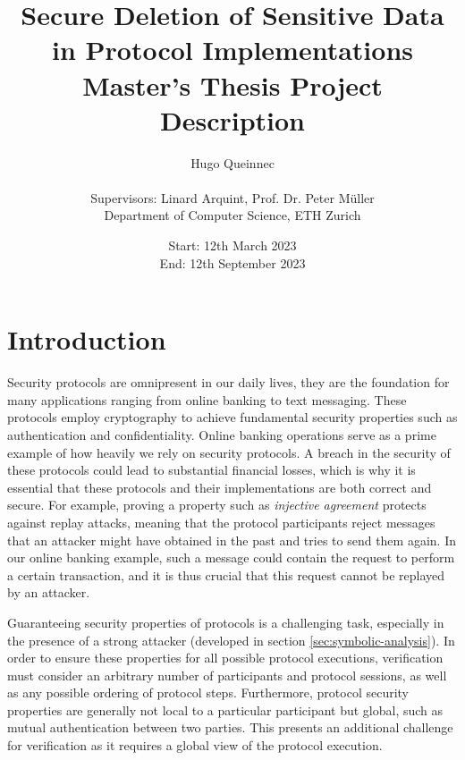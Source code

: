 \documentclass{article}
\title{Secure Deletion of Sensitive Data in Protocol Implementations\\
{\large Master's Thesis Project Description}}
\author{Hugo Queinnec \\ \\ Supervisors: Linard Arquint, Prof. Dr. Peter Müller \\
Department of Computer Science, ETH Zurich}
\date{Start: 12th March 2023 \\
      End: 12th September 2023 \\
}
\begin{document}
\maketitle

\thispagestyle{plain}
\pagestyle{plain}


\section{Introduction}

Security protocols are omnipresent in our daily lives, they are the foundation for many applications ranging from online banking to text messaging. These protocols employ cryptography to achieve fundamental security properties such as authentication and confidentiality.
Online banking operations serve as a prime example of how heavily we rely on security protocols. A breach in the security of these protocols could lead to substantial financial losses, which is why it is essential that these protocols and their implementations are both correct and secure.
For example, proving a property such as \emph{injective agreement} protects against replay attacks, meaning that the protocol participants reject messages that an attacker might have obtained in the past and tries to send them again. In our online banking example, such a message could contain the request to perform a certain transaction, and it is thus crucial that this request cannot be replayed by an attacker.

Guaranteeing security properties of protocols is a challenging task, especially in the presence of a strong attacker (developed in section \ref*{sec:symbolic-analysis}). In order to ensure these properties for all possible protocol executions, verification must consider an arbitrary number of participants and protocol sessions, as well as any possible ordering of protocol steps. Furthermore, protocol security properties are generally not local to a particular participant but global, such as mutual authentication between two parties. This presents an additional challenge for verification as it requires a global view of the protocol execution.
\end{document}
